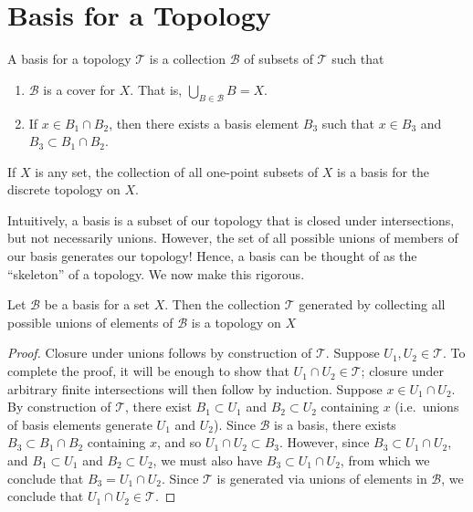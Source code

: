 \section{Basis for a Topology}
\begin{definition}
\label{def:basis}
A basis for a topology $\mathcal{T}$ is a collection $\mathcal{B}$ of subsets of
$\mathcal{T}$ such that
\begin{enumerate}
  \item $\mathcal{B}$ is a cover for $X$. That is, $\bigcup_{B \in
  \mathcal{B}} B = X$.
  \item If $x \in B_{1} \cap B_{2}$, then there exists a basis element
  $B_{3}$ such that $x \in B_{3}$ and $B_{3} \subset B_{1} \cap
  B_{2}$.
\end{enumerate}
\end{definition}
\begin{example}
If $X$ is any set, the collection of all one-point subsets of $X$
is a basis for the discrete topology on $X$.
\end{example}
Intuitively, a basis is a subset of our topology that is closed under
intersections, but not necessarily unions. However, the set of all possible
unions of members of our basis generates our topology!
Hence, a basis can be thought of as the ``skeleton'' of a topology.
We now make this rigorous.
\begin{theorem}
\label{thm:basis-gen-topology}
Let $\mathcal{B}$ be a basis for a set $X$. Then the collection $\mathcal{T}$
generated by collecting all possible unions of elements of $\mathcal{B}$ is
a topology on $X$
\end{theorem}
\begin{proof}
Closure under unions follows by construction of $\mathcal{T}$. Suppose
$U_{1}, U_{2} \in \mathcal{T}$. To complete the proof, it will be enough to
show that $U_{1} \cap U_{2} \in \mathcal{T}$; closure under arbitrary finite
intersections will then follow by induction. Suppose $x \in U_{1} \cap
U_{2}$. By construction of $\mathcal{T}$, there exist $B_{1} \subset U_{1}$
and $B_{2} \subset U_{2}$ containing $x$ (i.e.\ unions of basis elements
generate $U_{1}$ and $U_{2}$). Since $\mathcal{B}$ is a basis, there exists
$B_{3} \subset B_{1} \cap B_{2}$ containing $x$, and so $U_{1} \cap U_{2}
\subset B_{3}$. However, since $B_{3} \subset U_{1} \cap U_{2}$, and $B_{1}
\subset U_{1}$ and $B_{2} \subset U_{2}$, we must also have $B_{3} \subset
U_{1} \cap U_{2}$, from which we conclude that $B_{3} = U_{1} \cap U_{2}$.
Since $\mathcal{T}$ is generated via unions of elements in $\mathcal{B}$, we
conclude that $U_{1} \cap U_{2} \in \mathcal{T}$.
\end{proof}
